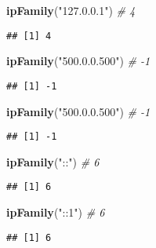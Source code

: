 \documentclass[]{book}
\newenvironment{Shaded}{\begin{snugshade}}{\end{snugshade}}
\newcommand{\KeywordTok}[1]{\textcolor[rgb]{0.13,0.29,0.53}{\textbf{#1}}}
\newcommand{\StringTok}[1]{\textcolor[rgb]{0.31,0.60,0.02}{#1}}
\newcommand{\CommentTok}[1]{\textcolor[rgb]{0.56,0.35,0.01}{\textit{#1}}}
\newcommand{\NormalTok}[1]{#1}
\theoremstyle{definition}
\theoremstyle{definition}
\theoremstyle{definition}
\theoremstyle{remark}
\begin{document}
\begin{Shaded}
\begin{Highlighting}[]
\KeywordTok{ipFamily}\NormalTok{(}\StringTok{"127.0.0.1"}\NormalTok{) }\CommentTok{# 4}
\end{Highlighting}
\end{Shaded}

\begin{verbatim}
## [1] 4
\end{verbatim}

\begin{Shaded}
\begin{Highlighting}[]
\KeywordTok{ipFamily}\NormalTok{(}\StringTok{"500.0.0.500"}\NormalTok{) }\CommentTok{# -1}
\end{Highlighting}
\end{Shaded}

\begin{verbatim}
## [1] -1
\end{verbatim}

\begin{Shaded}
\begin{Highlighting}[]
\KeywordTok{ipFamily}\NormalTok{(}\StringTok{"500.0.0.500"}\NormalTok{) }\CommentTok{# -1}
\end{Highlighting}
\end{Shaded}

\begin{verbatim}
## [1] -1
\end{verbatim}

\begin{Shaded}
\begin{Highlighting}[]
\KeywordTok{ipFamily}\NormalTok{(}\StringTok{"::"}\NormalTok{) }\CommentTok{# 6}
\end{Highlighting}
\end{Shaded}

\begin{verbatim}
## [1] 6
\end{verbatim}

\begin{Shaded}
\begin{Highlighting}[]
\KeywordTok{ipFamily}\NormalTok{(}\StringTok{"::1"}\NormalTok{) }\CommentTok{# 6}
\end{Highlighting}
\end{Shaded}

\begin{verbatim}
## [1] 6
\end{verbatim}
\end{document}
